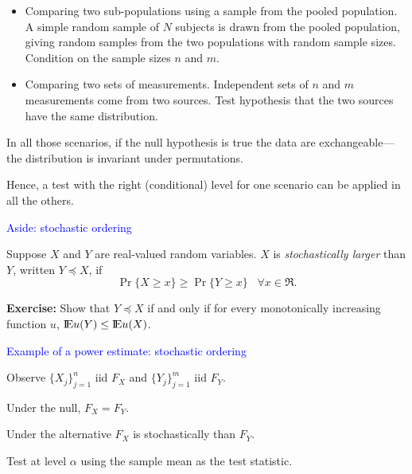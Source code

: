 \documentclass[landscape]{slides}
\newcommand{\EE}{\hbox{I\kern-.1667em\hbox{E}}}
\newcommand{\beq}{\begin{equation}}
\newcommand{\eeq}{\end{equation}}
\begin{document}
\begin{slide}
\begin{slide}
\begin{itemize}
   \item 
      Comparing two sub-populations using a sample from the pooled population. 
      A simple random sample of $N$ subjects is drawn from the pooled population, 
      giving random samples from the two populations with random sample sizes. 
      Condition on the sample sizes $n$ and $m$.
      
   \item
     Comparing two sets of measurements. Independent sets of $n$ and $m$ 
     measurements come from two sources. 
     Test hypothesis that the two sources have the same distribution.
 \end{itemize}
 
 \end{slide}

\begin{slide}
In all those scenarios, if the null hypothesis is true the data are exchangeable---the
distribution is invariant under permutations.

Hence, a test with the right (conditional) level for one scenario can be applied in all
the others.
\end{slide}

\begin{slide}
{\textcolor{blue}{Aside: stochastic ordering}}

Suppose $X$ and $Y$ are real-valued random variables.
 $X$ is {\em stochastically larger\/} than $Y$, written $Y \preceq X$, if
 \beq
    \Pr \{ X \ge x \} \ge \Pr \{ Y \ge x \}\;\;\; \forall x \in \Re.
\eeq

{\bf Exercise:}
Show that $Y \preceq X$ if and only if for every monotonically increasing function
$u$, $\EE u(Y) \le \EE u(X)$.

\end{slide}

\begin{slide}
{\textcolor{blue}{Example of a power estimate: stochastic ordering}}

 Observe $\{X_j\}_{j=1}^n$ iid $F_X$ and $\{Y_j\}_{j=1}^m$ iid $F_Y$.
 
 Under the null, $F_X = F_Y$.  
 
 Under the alternative $F_X$ is stochastically than $F_Y$.
 
 Test at level $\alpha$ using the sample mean as the test statistic.
 

\end{slide}
\end{slide}
\end{document}
